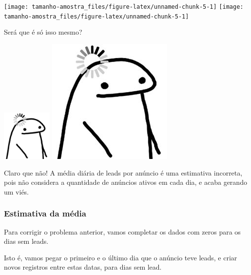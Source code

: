 \documentclass[
]{article}
\let\oldincludegraphics\includegraphics
\renewcommand{\includegraphics}[2][]{ \ifthenelse{ \equal{#1}{} } { \oldincludegraphics[width=2.5cm,height=2.5cm,keepaspectratio=true]{#2} } { \oldincludegraphics[#1]{#2} } }
\begin{document}
\begin{center}  { \texttt{[image: tamanho-amostra\_files/figure-latex/unnamed-chunk-5-1]} } { \texttt{[image: tamanho-amostra\_files/figure-latex/unnamed-chunk-5-1]} }  \end{center}

Será que é só isso mesmo?

\includegraphics{./images/flork-pensando.jpg}

Claro que não! A média diária de leads por anúncio é uma estimativa
incorreta, pois não considera a quantidade de anúncios ativos em cada
dia, e acaba gerando um viés.

\subsubsection{Estimativa da média}\label{estimativa-da-muxe9dia}

Para corrigir o problema anterior, vamos completar os dados com zeros
para os dias sem leads.

Isto é, vamos pegar o primeiro e o último dia que o anúncio teve leads,
e criar novos registros entre estas datas, para dias sem lead.
\end{document}
